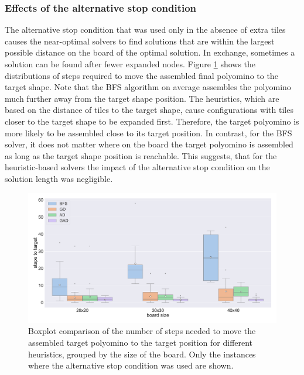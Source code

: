 \newpage

\subsubsection{Effects of the alternative stop condition}

The alternative stop condition that was used only in the absence of extra tiles causes the near-optimal solvers to find solutions that are within the largest possible distance on the board of the optimal solution. In exchange, sometimes a solution can be found after fewer expanded nodes. Figure \ref{fig:moves_to_target} shows the distributions of steps required to move the assembled final polyomino to the target shape. Note that the BFS algorithm on average assembles the polyomino much further away from the target shape position. The heuristics, which are based on the distance of tiles to the target shape, cause configurations with tiles closer to the target shape to be expanded first. Therefore, the target polyomino is more likely to be assembled close to its target position. In contrast, for the BFS solver, it does not matter where on the board the target polyomino is assembled as long as the target shape position is reachable. This suggests, that for the heuristic-based solvers the impact of the alternative stop condition on the solution length was negligible.

\begin{figure}[htpb]
\centering
\includegraphics[width=\textwidth]{figures/plots/heuristic_solvers_i1/hs_i1_moves_to_target_over_board_size.pdf}
\caption[Number of steps after assembly of the final polyomino]{Boxplot comparison of the number of steps needed to move the assembled target polyomino to the target position for different heuristics, grouped by the size of the board. Only the instances where the alternative stop condition was used are shown.}
\label{fig:moves_to_target}
\end{figure}

